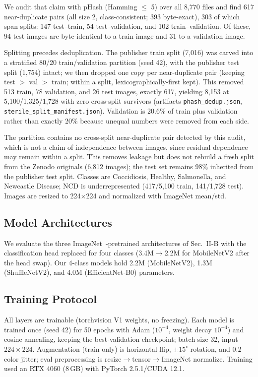 \documentclass[conference,a4paper]{IEEEtran}
\begin{document}
We audit that claim with pHash (Hamming $\le$ 5) over all 8,770 files and find 617 near-duplicate pairs (all size 2, class-consistent; 393 byte-exact), 303 of which span splits: 147 test--train, 54 test--validation, and 102 train--validation. Of these, 94 test images are byte-identical to a train image and 31 to a validation image.

Splitting precedes deduplication. The publisher train split (7,016) was carved into a stratified 80/20 train/validation partition (seed 42), with the publisher test split (1,754) intact; we then dropped one copy per near-duplicate pair (keeping test $>$ val $>$ train; within a split, lexicographically-first kept). This removed 513 train, 78 validation, and 26 test images, exactly 617, yielding 8,153 at 5,100/1,325/1,728 with zero cross-split survivors (artifacts \texttt{phash\_dedup.json}, \texttt{sterile\_split\_manifest.json}). Validation is 20.6\% of train plus validation rather than exactly 20\% because unequal numbers were removed from each side.

The partition contains no cross-split near-duplicate pair detected by this audit, which is not a claim of independence between images, since residual dependence may remain within a split. This removes leakage but does not rebuild a fresh split from the Zenodo originals (6,812 images); the test set remains 98\% inherited from the publisher test split. Classes are Coccidiosis, Healthy, Salmonella, and Newcastle Disease; NCD is underrepresented (417/5,100 train, 141/1,728 test). Images are resized to 224$\times$224 and normalized with ImageNet mean/std.

\subsection{Model Architectures}
We evaluate the three ImageNet~\cite{deng2009}-pretrained architectures of Sec.~II-B with the classification head replaced for four classes (3.4M$\rightarrow$2.2M for MobileNetV2 after the head swap). Our 4-class models hold 2.2M (MobileNetV2), 1.3M (ShuffleNetV2), and 4.0M (EfficientNet-B0) parameters.

\subsection{Training Protocol}
All layers are trainable (torchvision V1 weights, no freezing). Each model is trained once (seed 42) for 50 epochs with Adam ($10^{-4}$, weight decay $10^{-4}$) and cosine annealing, keeping the best-validation checkpoint; batch size 32, input $224\times224$. Augmentation (train only) is horizontal flip, $\pm 15^\circ$ rotation, and 0.2 color jitter; eval preprocessing is resize$\to$tensor$\to$ImageNet normalize. Training used an RTX 4060 (8\,GB) with PyTorch 2.5.1/CUDA 12.1.
\end{document}
